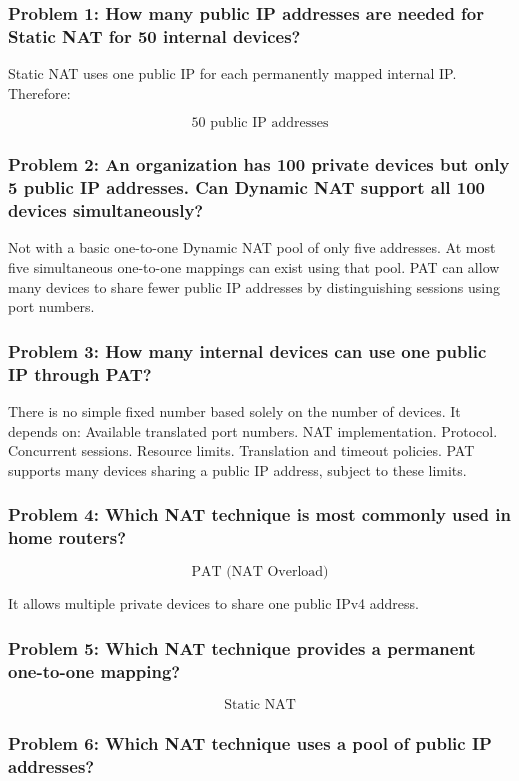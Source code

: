 \subsubsection*{Problem 1: How many public IP addresses are needed for Static NAT for 50 internal devices?}
Static NAT uses one public IP for each permanently mapped internal IP.
Therefore:

\[
\boxed{50\text{ public IP addresses}}
\]

\subsubsection*{Problem 2: An organization has 100 private devices but only 5 public IP addresses. Can Dynamic NAT support all 100 devices simultaneously?}
Not with a basic one-to-one Dynamic NAT pool of only five addresses.
At most five simultaneous one-to-one mappings can exist using that pool.
PAT can allow many devices to share fewer public IP addresses by distinguishing sessions using port numbers.
\subsubsection*{Problem 3: How many internal devices can use one public IP through PAT?}
There is no simple fixed number based solely on the number of devices.
It depends on:
Available translated port numbers.
NAT implementation.
Protocol.
Concurrent sessions.
Resource limits.
Translation and timeout policies.
PAT supports many devices sharing a public IP address, subject to these limits.
\subsubsection*{Problem 4: Which NAT technique is most commonly used in home routers?}

\[
\boxed{\text{PAT (NAT Overload)}}
\]

It allows multiple private devices to share one public IPv4 address.
\subsubsection*{Problem 5: Which NAT technique provides a permanent one-to-one mapping?}

\[
\boxed{\text{Static NAT}}
\]

\subsubsection*{Problem 6: Which NAT technique uses a pool of public IP addresses?}

